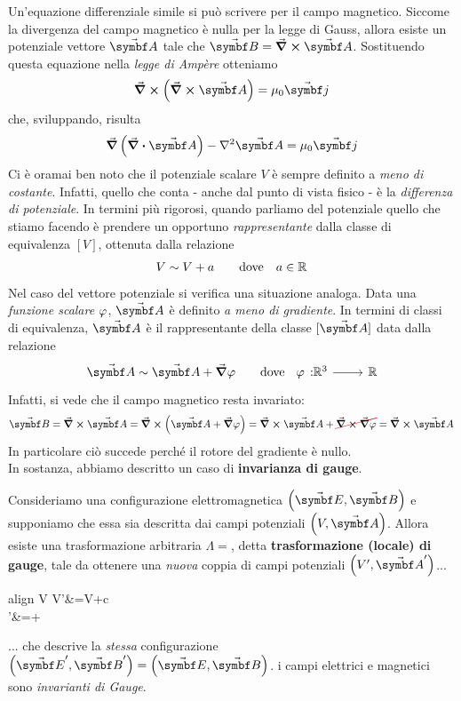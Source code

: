 Un'equazione differenziale simile si può scrivere per il campo magnetico.		Siccome la divergenza del campo magnetico è nulla per la legge di Gauss, allora esiste un potenziale vettore $\vba{A}$ tale che $\vba{B}=\curl{\vba{A}}$. Sostituendo questa equazione nella \textit{legge di Ampère} otteniamo
\begin{equation*}
	\curl\left(\curl\vba{A}\right)=\mu_0\vba j
\end{equation*}
che, sviluppando, risulta
\begin{equation*}
	\grad \left( \div{\vba{A}}\right) - \laplacian{\vba{A}}=\mu_0 \vba j
\end{equation*}
Ci è oramai ben noto che il potenziale scalare $V$ è sempre definito a \textit{meno di costante}. Infatti, quello che conta - anche dal punto di vista fisico - è la \textit{differenza di potenziale}. In termini più rigorosi, quando parliamo del potenziale quello che stiamo facendo è prendere un opportuno \textit{rappresentante} dalla classe di equivalenza $\left[V\right]$, ottenuta dalla relazione
\begin{align*}
	V\sim V+a \qquad \text{dove}\quad a\in\mathbb{R}
\end{align*}
Nel caso del vettore potenziale si verifica una situazione analoga. Data una \textit{funzione scalare} $\oldphi$, $\vba{A}$ è definito \textit{a meno di gradiente}. In termini di classi di equivalenza, $\vba{A}$ è il rappresentante della classe $[\vba{A}]$ data dalla relazione
\begin{align*}
	\vba{A}\sim \vba{A}+\grad{\phi} \qquad \text{dove}\quad \funz[\phi]{\realset^3}{\realset}
\end{align*}
Infatti, si vede che il campo magnetico resta invariato:
\begin{equation*}
	\vba{B}=\curl\vba{A}=\curl \left( \vba{A}+\grad\oldphi\right)= \curl \vba{A} + \Ccancel[red]{\curl\grad\oldphi}=\curl\vba{A}		
\end{equation*}
In particolare ciò succede perché il rotore del gradiente è nullo.\\
In sostanza, abbiamo descritto un caso di \textbf{invarianza di gauge}.
\begin{define}
	Consideriamo una configurazione elettromagnetica $\left(\vba{E},\vba{B}\right)$ e supponiamo che essa sia descritta dai campi potenziali $\left(V,\vba {A}\right)$. Allora esiste una trasformazione arbitraria $\Lambda=$, detta \textbf{trasformazione (locale) di gauge}, tale da ottenere una \textit{nuova} coppia di campi potenziali $\left(V',\vba {A}'\right)$...
	\begin{empheq}[box=\tcmathboxdefine]{align}
		V\overset{\Lambda}{\longleftrightarrow} V'&=V+c\\
		\overset{\Lambda}{\longleftrightarrow} \vba{A}'&=+\grad{\phi}
	\end{empheq}
	... che descrive la \textit{stessa} configurazione $\left(\vba{E}',\vba{B}'\right)=\left(\vba{E},\vba{B}\right)$. i campi elettrici e magnetici sono \textit{invarianti di Gauge}.
\end{define}

